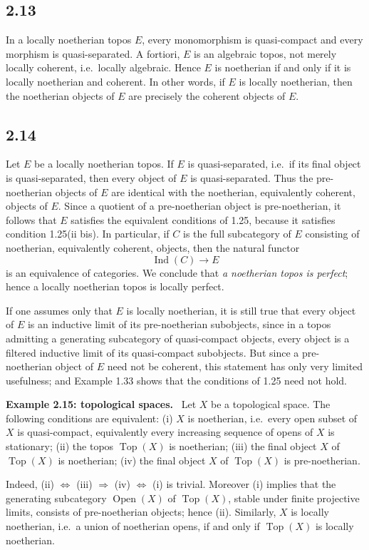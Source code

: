 \documentclass[11pt]{article}
\newcommand{\Top}{\operatorname{Top}}
\newcommand{\Open}{\operatorname{Open}}
\newcommand{\Ind}{\operatorname{Ind}}
\newcommand{\ie}{i.e.\ }
\newenvironment{remarktext}[1]{\par\medskip\noindent\textbf{#1.}\ }{\par\medskip}
\begin{document}
\subsection*{2.13}
In a locally noetherian topos \(E\), every monomorphism is quasi-compact and every morphism is quasi-separated. A fortiori, \(E\) is an algebraic topos, not merely locally coherent, \ie locally algebraic. Hence \(E\) is noetherian if and only if it is locally noetherian and coherent. In other words, if \(E\) is locally noetherian, then the noetherian objects of \(E\) are precisely the coherent objects of \(E\).

\subsection*{2.14}
Let \(E\) be a locally noetherian topos. If \(E\) is quasi-separated, \ie if its final object is quasi-separated, then every object of \(E\) is quasi-separated. Thus the pre-noetherian objects of \(E\) are identical with the noetherian, equivalently coherent, objects of \(E\). Since a quotient of a pre-noetherian object is pre-noetherian, it follows that \(E\) satisfies the equivalent conditions of 1.25, because it satisfies condition 1.25(ii bis). In particular, if \(C\) is the full subcategory of \(E\) consisting of noetherian, equivalently coherent, objects, then the natural functor
\[
\Ind(C)\longrightarrow E
\]
is an equivalence of categories. We conclude that \emph{a noetherian topos is perfect}; hence a locally noetherian topos is locally perfect.

If one assumes only that \(E\) is locally noetherian, it is still true that every object of \(E\) is an inductive limit of its pre-noetherian subobjects, since in a topos admitting a generating subcategory of quasi-compact objects, every object is a filtered inductive limit of its quasi-compact subobjects. But since a pre-noetherian object of \(E\) need not be coherent, this statement has only very limited usefulness; and Example 1.33 shows that the conditions of 1.25 need not hold.

\begin{remarktext}{Example 2.15: topological spaces}
Let \(X\) be a topological space. The following conditions are equivalent: (i) \(X\) is noetherian, \ie every open subset of \(X\) is quasi-compact, equivalently every increasing sequence of opens of \(X\) is stationary; (ii) the topos \(\Top(X)\) is noetherian; (iii) the final object \(X\) of \(\Top(X)\) is noetherian; (iv) the final object \(X\) of \(\Top(X)\) is pre-noetherian.

Indeed, (ii) \(\Leftrightarrow\) (iii) \(\Rightarrow\) (iv) \(\Leftrightarrow\) (i) is trivial. Moreover (i) implies that the generating subcategory \(\Open(X)\) of \(\Top(X)\), stable under finite projective limits, consists of pre-noetherian objects; hence (ii). Similarly, \(X\) is locally noetherian, \ie a union of noetherian opens, if and only if \(\Top(X)\) is locally noetherian.
\end{remarktext}
\end{document}
